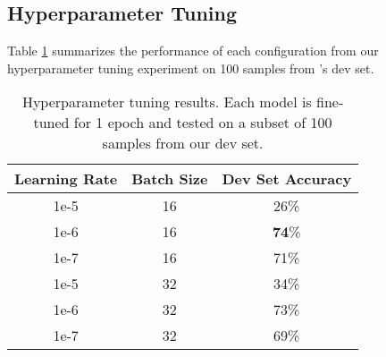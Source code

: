 \subsection{Hyperparameter Tuning}
Table \ref{tab:hyperparam} summarizes the performance of each configuration from our hyperparameter tuning experiment on 100 samples from \pipeline's dev set.
\begin{table}[htbp]
\small
\centering
\begin{tabular}{@{}ccc@{}}
\toprule
Learning Rate & Batch Size &Dev Set Accuracy \\ \midrule
1e-5 & 16& 26\% \\
1e-6 & 16& \textbf{74}\% \\
1e-7 & 16& 71\% \\
1e-5 & 32& 34\% \\
1e-6 & 32& 73\% \\
1e-7 & 32& 69\% \\ \bottomrule
\end{tabular}
\caption{Hyperparameter tuning results. Each model is fine-tuned for 1 epoch and tested on a subset of 100 samples from our dev set.}
\label{tab:hyperparam}
\end{table}






